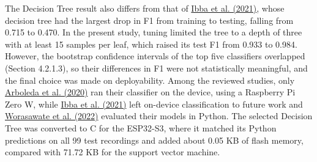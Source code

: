 \begin{thesisprose}
The Decision Tree result also differs from that of \hyperlink{cite.ibba2021}{Ibba et al. (2021)}, whose decision tree had the largest drop in F1 from training to testing, falling from 0.715 to 0.470. In the present study, tuning limited the tree to a depth of three with at least 15 samples per leaf, which raised its test F1 from 0.933 to 0.984. However, the bootstrap confidence intervals of the top five classifiers overlapped (Section 4.2.1.3), so their differences in F1 were not statistically meaningful, and the final choice was made on deployability. Among the reviewed studies, only \hyperlink{cite.arboleda2020}{Arboleda et al. (2020)} ran their classifier on the device, using a Raspberry Pi Zero W, while \hyperlink{cite.ibba2021}{Ibba et al. (2021)} left on-device classification to future work and \hyperlink{cite.worasawate2022}{Worasawate et al. (2022)} evaluated their models in Python. The selected Decision Tree was converted to C for the ESP32-S3, where it matched its Python predictions on all 99 test recordings and added about 0.05 KB of flash memory, compared with 71.72 KB for the support vector machine.


\end{thesisprose}

